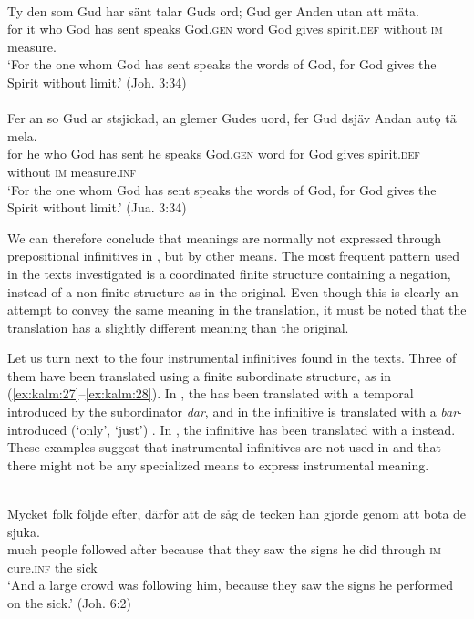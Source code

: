 \documentclass[output=paper]{langscibook}
\begin{document}
\ea
\label{ex:kalm:26}
\ea {}\label{ex:kalm:26a}\\
\gll Ty den som Gud har sänt talar Guds ord; Gud ger Anden utan att mäta.\\
for it who God has sent speaks God.\textsc{gen} word God gives spirit.\textsc{def} without \textsc{im} measure.\\
\glt ‘For the one whom God has sent speaks the words of God, for God gives the Spirit without limit.’ (Joh. 3:34)\\

\ex {}\label{ex:kalm:26b}\\
\gll Fer an so Gud ar stsjickad, an glemer Gudes uord, fer Gud dsjäv Andan autǫ tä mela.\\
for he who God has sent he speaks God.\textsc{gen} word for God gives spirit.\textsc{def} without \textsc{im} measure.\textsc{inf}\\
\glt ‘For the one whom God has sent speaks the words of God, for God gives the Spirit without limit.’ (Jua. 3:34)
\z
\z 


We can therefore conclude that  meanings are normally not expressed through prepositional infinitives in , but by other means. The most frequent pattern used in the texts investigated is a coordinated finite structure containing a negation, instead of a non-finite structure as in the  original. Even though this is clearly an attempt to convey the same meaning in the translation, it must be noted that the translation has a slightly different meaning than the  original. 



Let us turn next to the four instrumental infinitives found in the  texts. Three of them have been translated using a finite subordinate structure, as in (\ref{ex:kalm:27}–\ref{ex:kalm:28}). In , the   has been translated with a temporal  introduced by the subordinator \textit{dar}, and in  the infinitive is translated with a \textit{bar}-introduced (‘only’, ‘just’) . In , the infinitive has been translated with a  instead. These examples suggest that instrumental infinitives are not used in  and that there might not be any specialized means to express instrumental meaning. 


\ea
\label{ex:kalm:27}
\ea {}\label{ex:kalm:27a}\\
\gll Mycket folk följde efter, därför att de såg de tecken han gjorde genom att bota de sjuka.\\
 much people followed after because that they saw the signs he did through \textsc{im} cure.\textsc{inf} the sick\\
\glt ‘And a large crowd was following him, because they saw the signs he performed on the sick.’ (Joh. 6:2)\\
\end{document}
